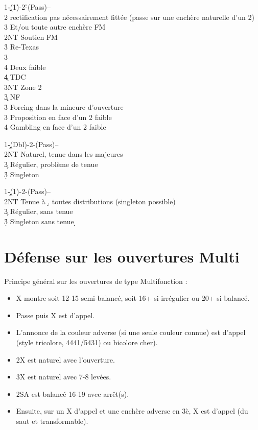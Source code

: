 \documentclass[a4paper]{article}
\begin{document}
\begin{bidtable}
1\c\d-(1\h)-2\h-(Pass)--\\
2\s \> rectification pas nécessairement fittée (passe sur une enchère naturelle d'un 2\s )\+\\
3\s \> Et/ou toute autre enchère FM\-\\
2NT \> Soutien FM\+\\
3\h \> Re-Texas\+\\
3\s\+\\
4\s \> Deux faible\\
4\c \> TDC\\
3NT \> Zone 2\-\-\-\\
3\c\d \> NF\\
3\h \> Forcing dans la mineure d'ouverture\\
3\s \> Proposition en face d'un 2 faible\\
4\s \> Gambling en face d'un 2 faible
\end{bidtable}

\begin{bidtable}
1\c-(Dbl)-2\s-(Pass)--\\
2NT \> Naturel, tenue dans les majeures\\
3\c \> Régulier, problème de tenue\\
3\d\h\s \> Singleton
\end{bidtable}

\begin{bidtable}
1\c-(1\d)-2\s-(Pass)--\\
2NT \> Tenue à \d , toutes distributions (singleton possible)\\
3\c \> Régulier, sans tenue \d \\
3\d\h\s \> Singleton sans tenue \d 
\end{bidtable}

\section{Défense sur les ouvertures Multi}

Principe général sur les ouvertures de type Multifonction :

\begin{itemize}
\item X montre soit 12-15 semi-balancé, soit 16+ si irrégulier ou 20+ si balancé.

\item Passe puis X est d'appel.

\item L'annonce de la couleur adverse (si une seule couleur connue) est d'appel (style tricolore, 4441/5431) ou bicolore cher).

\item 2X est naturel avec l'ouverture.

\item 3X est naturel avec 7-8 levées.

\item 2SA est balancé 16-19 avec arrêt(s).

\item Ensuite, sur un X d'appel et une enchère adverse en 3è, X est d'appel (du saut et transformable).

\end{itemize}
\end{document}
